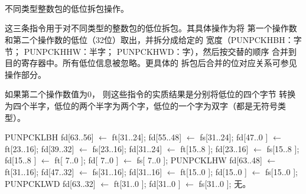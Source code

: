 \begin{instructionblk}
   \\
   \\
   \\
  {不同类型整数包的低位拆包操作。}
  {这三条指令用于对不同类型的整数包的低位拆包。其具体操作为将
  第一个操作数和第二个操作数的低位（32位）取出，并拆分成给定的
  宽度（PUNPCKHBH：字节； PUNPCKHHW：半字； PUNPCKHWD：字），然后按交替的顺序
  合并到目的寄存器中。所有低位信息被忽略。更具体的
  拆包后合并的位对应关系可参见操作部分。
  
  如果第二个操作数值为0， 则这些指令的实质结果是分别将低位的四个字节
  转换为四个半字，低位的两个半字为两个字，低位的一个字为双字（都是无符号类型）。}
  {PUNPCKLBH \narrownewline
  fd[63..56] $\leftarrow$ ft[31..24]; \narrownewline
  fd[55..48] $\leftarrow$ fs[31..24]; \narrownewline
  fd[47..0 ] $\leftarrow$ ft[23..16]; \narrownewline
  fd[39..32] $\leftarrow$ fs[23..16]; \narrownewline
  fd[31..24] $\leftarrow$ ft[15..8 ]; \narrownewline
  fd[23..16] $\leftarrow$ fs[15..8 ]; \narrownewline
  fd[15..8 ] $\leftarrow$  ft[ 7..0 ]; \narrownewline
  fd[ 7..0 ]  $\leftarrow$ fs[ 7..0 ]; \narrownewline \narrownewline
  PUNPCKLHW \narrownewline
  fd[63..48] $\leftarrow$ ft[31..16]; \narrownewline
  fd[47..32] $\leftarrow$ fs[31..16]; \narrownewline
  fd[31..16] $\leftarrow$ ft[15..0 ]; \narrownewline
  fd[15..0 ] $\leftarrow$ fs[15..0 ]; \narrownewline \narrownewline
  PUNPCKLWD \narrownewline
  fd[63..32] $\leftarrow$ ft[31..0 ]; \narrownewline
  fd[31..0 ] $\leftarrow$ fs[31..0 ];}
  {无。}
\end{instructionblk}
